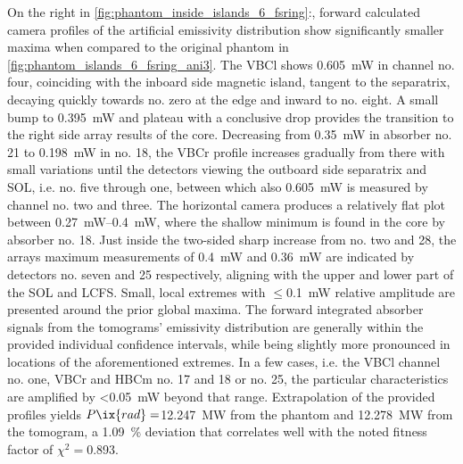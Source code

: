                 On the right in \cref{fig:phantom_inside_islands_6_fsring}:, forward calculated camera profiles of the artificial emissivity distribution show significantly smaller maxima when compared to the original phantom in \cref{fig:phantom_islands_6_fsring_ani3}. The VBCl shows \SI{0.605}{\milli\watt} in channel no. four, coinciding with the inboard side magnetic island, tangent to the separatrix, decaying quickly towards no. zero at the edge and inward to no. eight. A small bump to \SI{0.395}{\milli\watt} and plateau with a conclusive drop provides the transition to the right side array results of the core. Decreasing from \SI{0.35}{\milli\watt} in absorber no. 21 to \SI{0.198}{\milli\watt} in no. 18, the VBCr profile increases gradually from there with small variations until the detectors viewing the outboard side separatrix and SOL, i.e. no. five through one, between which also \SI{0.605}{\milli\watt} is measured by channel no. two and three. The horizontal camera produces a relatively flat plot between \SIrange{0.27}{0.4}{\milli\watt}, where the shallow minimum is found in the core by absorber no. 18. Just inside the two-sided sharp increase from no. two and 28, the arrays maximum measurements of \SI{0.4}{\milli\watt} and \SI{0.36}{\milli\watt} are indicated by detectors no. seven and 25 respectively, aligning with the upper and lower part of the SOL and LCFS. Small, local extremes with $\le$\SI{0.1}{\milli\watt} relative amplitude are presented around the prior global maxima. The forward integrated absorber signals from the tomograms' emissivity distribution are generally within the provided individual confidence intervals, while being slightly more pronounced in locations of the aforementioned extremes. In a few cases, i.e. the VBCl channel no. one, VBCr and HBCm no. 17 and 18 or no. 25, the particular characteristics are amplified by <\SI{0.05}{\milli\watt} beyond that range. Extrapolation of the provided profiles yields $P\ix{rad}=$\SI{12.247}{\mega\watt} from the phantom and \SI{12.278}{\mega\watt} from the tomogram, a \SI{1.09}{\percent} deviation that correlates well with the noted fitness factor of $\chi^{2}=$\SI{0.893}{\arbitraryunit}.\\%
